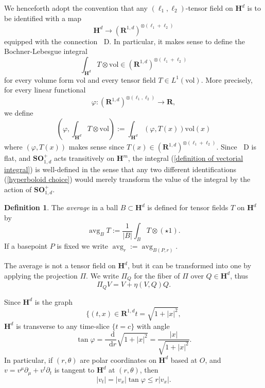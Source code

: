 \documentclass[reqno,10pt]{amsart}
\newcommand{\RR}{\mathbf{R}}
\newcommand{\Hyp}{\mathbf H}
\newcommand{\SpOrth}{\mathbf{SO}}
\DeclareMathOperator{\avg}{avg}
\newcommand*\dif{\mathop{}\!\mathrm{d}}
\newcommand*\Dif{\mathop{}\!\mathrm{D}}
\newcommand{\vol}{\mathrm{vol}}
\newcommand{\dfn}[1]{\emph{#1}\index{#1}}
\theoremstyle{definition}
\newtheorem{definition}[theorem]{Definition}
\numberwithin{equation}{section}
\begin{document}
We henceforth adopt the convention that any $(\ell_1, \ell_2)$-tensor field on $\Hyp^d$ is to be identified with a map
$$\Hyp^d \to (\RR^{1, d})^{\otimes(\ell_1 + \ell_2)}$$
equipped with the connection $\Dif$.
In particular, it makes sense to define the Bochner-Lebesgue integral
\begin{equation}\label{definition of vectorial integral}
\int_{\Hyp^d} T \otimes \vol \in (\RR^{1, d})^{\otimes (\ell_1 + \ell_2)}
\end{equation}
for every volume form $\vol$ and every tensor field $T \in L^1(\vol)$. More precisely, for every linear functional
$$\varphi: (\RR^{1, d})^{\otimes(\ell_1, \ell_2)} \to \RR,$$
we define
$$\left(\varphi, \int_{\Hyp^d} T \otimes \vol\right) := \int_{\Hyp^d} (\varphi, T(x)) \vol(x)$$
where $(\varphi, T(x))$ makes sense since $T(x) \in (\RR^{1, d})^{\otimes (\ell_1 + \ell_2)}$.
Since $\Dif$ is flat, and  $\SpOrth^+_{1, d}$ acts transitively on $\Hyp^m$, the integral (\ref{definition of vectorial integral}) is well-defined in the sense that any two different identifications (\ref{hyperboloid choice}) would merely transform the value of the integral by the action of $\SpOrth^+_{1, d}$.

\begin{definition}
The \dfn{average} in a ball $B \subset \Hyp^d$ is defined for tensor fields $T$ on $\Hyp^d$ by
$$\avg_B T := \frac{1}{|B|} \int_B T \otimes (\star 1).$$
If a basepoint $P$ is fixed we write $\avg_r := \avg_{B(P, r)}$.
\end{definition}

The average is not a tensor field on $\Hyp^d$, but it can be transformed into one by applying the projection $\Pi$.
We write $\Pi_Q$ for the fiber of $\Pi$ over $Q \in \Hyp^d$, thus
\begin{equation}\label{projection formula}
\Pi_Q V = V + \eta(V, Q)Q.
\end{equation}

Since $\Hyp^d$ is the graph 
$$\{(t, x) \in \RR^{1, d} t = \sqrt{1 + |x|^2},$$
$\Hyp^d$ is transverse to any time-slice $\{t = c\}$ with angle 
\begin{equation}\label{angle of slice}
\tan \varphi = \frac{\dif}{\dif r} \sqrt{1 + |x|^2} = \frac{|x|}{\sqrt{1 + |x|^2}}.
\end{equation}
In particular, if $(r, \theta)$ are polar coordinates on $\Hyp^d$ based at $O$, and $v = v^\mu \partial_\mu + v^t \partial_t$ is tangent to $\Hyp^d$ at $(r, \theta)$, then 
\begin{equation}\label{bound the timelike part}
|v_t| = |v_x| \tan \varphi \leq r|v_x|.
\end{equation}
\end{document}
